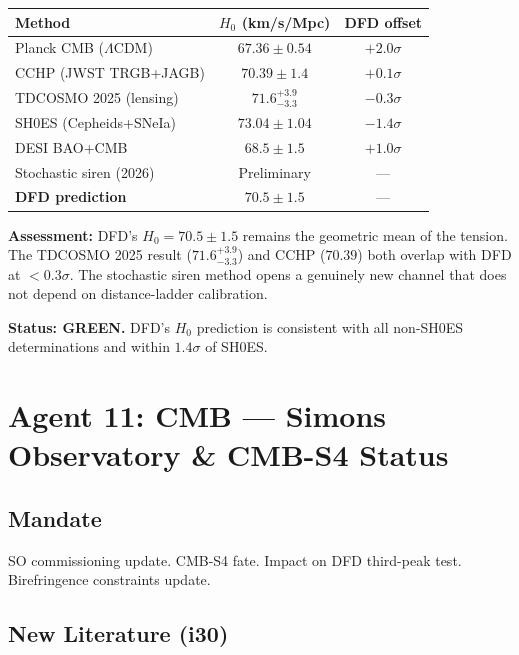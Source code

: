 \documentclass[11pt,a4paper]{article}
\begin{document}
\begin{center}
\begin{tabular}{lcc}
\toprule
\textbf{Method} & \textbf{$H_0$ (km/s/Mpc)} & \textbf{DFD offset} \\
\midrule
Planck CMB ($\Lambda$CDM) & $67.36 \pm 0.54$ & $+2.0\sigma$ \\
CCHP (JWST TRGB+JAGB) & $70.39 \pm 1.4$ & $+0.1\sigma$ \\
TDCOSMO 2025 (lensing) & $71.6^{+3.9}_{-3.3}$ & $-0.3\sigma$ \\
SH0ES (Cepheids+SNeIa) & $73.04 \pm 1.04$ & $-1.4\sigma$ \\
DESI BAO+CMB & $68.5 \pm 1.5$ & $+1.0\sigma$ \\
Stochastic siren (2026) & Preliminary & --- \\
\midrule
\textbf{DFD prediction} & $70.5 \pm 1.5$ & --- \\
\bottomrule
\end{tabular}
\end{center}

\textbf{Assessment:} DFD's $H_0 = 70.5 \pm 1.5$ remains the geometric mean of the tension. The TDCOSMO 2025 result ($71.6^{+3.9}_{-3.3}$) and CCHP ($70.39$) both overlap with DFD at $< 0.3\sigma$. The stochastic siren method opens a genuinely new channel that does not depend on distance-ladder calibration.

\textbf{Status: GREEN.} DFD's $H_0$ prediction is consistent with all non-SH0ES determinations and within $1.4\sigma$ of SH0ES.

\section{Agent 11: CMB --- Simons Observatory \& CMB-S4 Status}

\subsection{Mandate}
SO commissioning update. CMB-S4 fate. Impact on DFD third-peak test. Birefringence constraints update.

\subsection{New Literature (i30)}
\end{document}
